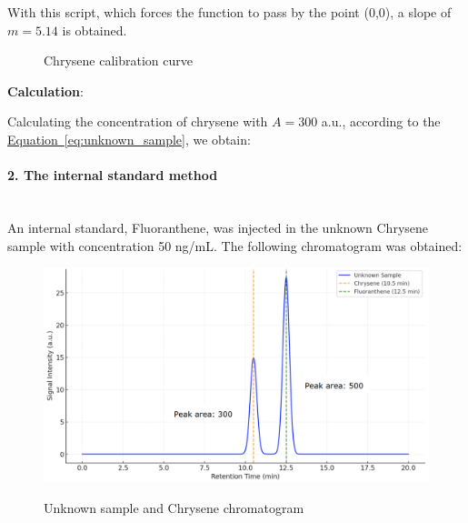 \documentclass{article}
\newcommand{\figbox}[1]{ 
    \begin{figure}[ht!]        
        \begin{center}            
            \fbox{#1}        
        \end{center}    
    \end{figure}
}
\newcommand{\refeq}[1]{\hyperref[#1]{Equation~\ref*{#1}}}
\newcommand{\pph}[1]{\paragraph{#1}\phantom{}\\}
\newcommand{\dm}{\displaystyle}
\begin{document}
\newpage
With this script, which forces the function to pass by the point (0,0), a slope of $m=5.14$
is obtained.

\vspace*{.5cm}
\begin{figure}[h!]
    \centering
    \caption{Chrysene calibration curve}
    \label{fig:tap_ph}
\end{figure}
\vspace*{.5cm}

\textbf{Calculation}:

Calculating the concentration of chrysene with $A=300$ a.u., according to the \refeq{eq:unknown_sample},
we obtain:
\vspace*{.5cm}
\figbox{$\dm x = \frac{300 \text{ a.u.} - 0}{5.14} = 58.33 \text{ ng/mL}$}

\newpage
\pph{2. The internal standard method}
An internal standard, Fluoranthene, was injected in the unknown Chrysene sample with
concentration 50 ng/mL. The following chromatogram was obtained:
\vspace*{.5cm}
\begin{figure}[ht!]
    \centering
    \includegraphics[width=.8\textwidth]{media/question_2.2.png}
    \label{fig:question_2.2}
    \caption{Unknown sample and Chrysene chromatogram}
\end{figure}
\end{document}
